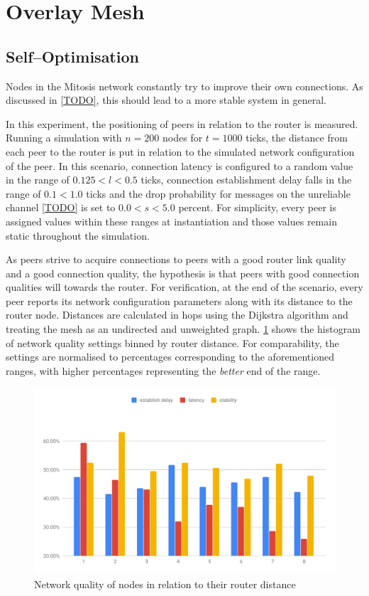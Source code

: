 \section{Overlay Mesh}

\subsection{Self–Optimisation}
Nodes in the Mitosis network constantly try to improve their own connections. As discussed in \ref{TODO}, this should lead to a more stable system in general.

In this experiment, the positioning of peers in relation to the router is measured. Running a simulation with $n=200$ nodes for $t=1000$ ticks, the distance from each peer to the router is put in relation to the simulated network configuration of the peer. In this scenario, connection latency is configured to a random value in the range of $0.125<l<0.5$ ticks, connection establishment delay falls in the range of $0.1<1.0$ ticks and the drop probability for messages on the unreliable channel \vref{TODO} is set to $0.0<s<5.0$ percent. For simplicity, every peer is assigned values within these ranges at instantiation and those values remain static throughout the simulation.

As peers strive to acquire connections to peers with a good router link quality and a good connection quality, the hypothesis is that peers with good connection qualities will  towards the router. For verification, at the end of the scenario, every peer reports its network configuration parameters along with its distance to the router node. Distances are calculated in hops using the Dijkstra algorithm and treating the mesh as an undirected and unweighted graph.
\cref{fig:connection-quality-per-distance} shows the histogram of network quality settings binned by router distance. For comparability, the settings are normalised to percentages corresponding to the aforementioned ranges, with higher percentages representing the \textit{better} end of the range.

\begin{figure}[htb!]
\centering
\includegraphics[width=1.0\textwidth]{graphics/analysis/connection-quality-per-distance.pdf}
\caption{Network quality of nodes in relation to their router distance}
\label{fig:connection-quality-per-distance}
\end{figure}

